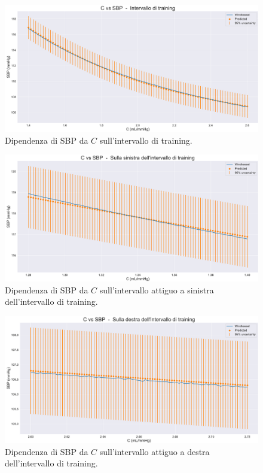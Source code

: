 \vspace{0.32cm}

\begin{figure}[!htb]
    \centering
    \includegraphics[width=1\textwidth]{images/Training (risultati)/SBP/SBP - C - training.pdf}
    \caption{Dipendenza di SBP da $C$ sull'intervallo di training.}
    \label{SBP - C - training}
\end{figure}

\begin{figure}
    \centering
    \includegraphics[width=1\textwidth]{images/Training (risultati)/SBP/SBP - C - sx.pdf}
    \caption{Dipendenza di SBP da $C$ sull'intervallo attiguo a sinistra dell'intervallo di training.}
    \label{SBP - C - sx}
\end{figure}


\begin{figure}
    \centering
    \includegraphics[width=1\textwidth]{images/Training (risultati)/SBP/SBP - C - dx.pdf}
    \caption{Dipendenza di SBP da $C$ sull'intervallo attiguo a destra dell'intervallo di training.}
    \label{SBP - C - dx}
\end{figure}



